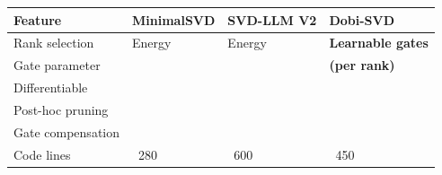 \begin{table}[H]
\centering
\small
\begin{tabular}{llll}
\toprule
\textbf{Feature} & \textbf{MinimalSVD} & \textbf{SVD-LLM V2} & \textbf{Dobi-SVD} \\
\midrule
Rank selection & Energy & Energy & \textbf{Learnable gates} \\
Gate parameter &  &  & \textbf{  (per rank)} \\
Differentiable &  &  & \textbf{ } \\
Post-hoc pruning &  &  & \textbf{ } \\
Gate compensation &  &  & \textbf{ } \\
Code lines & ~280 & ~600 & ~450 \\
\bottomrule
\end{tabular}
\end{table}

